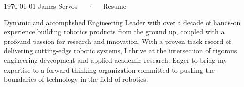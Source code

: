 \documentclass[11pt, a4paper]{awesome-cv}
\begin{document}
\makecvheader[C]

\makecvfooter
  {\today}
  {James Servos~~~·~~~Resume}
  {\thepage}


\vspace*{-3mm}

\begin{cvparagraph}

Dynamic and accomplished Engineering Leader with over a decade of hands-on experience building robotics products from the ground up, coupled with a profound passion for research and innovation. With a proven track record of delivering cutting-edge robotic systems, I thrive at the intersection of rigorous engineering deveopment and applied academic research. Eager to bring my expertise to a forward-thinking organization committed to pushing the boundaries of technology in the field of robotics.

\end{cvparagraph}
\end{document}

